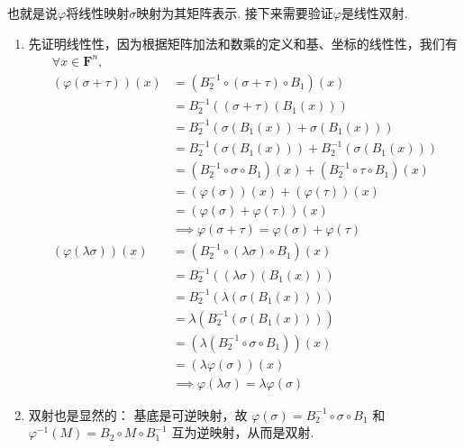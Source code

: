 也就是说$\varphi$将线性映射$\sigma$映射为其矩阵表示. 接下来需要验证$\varphi$是线性双射.
\begin{enumerate}
    \item 先证明线性性，因为根据矩阵加法和数乘的定义和基、坐标的线性性，我们有
          \begin{align*}
            \forall x\in\mathbf{F}^n, \\
            (\varphi(\sigma + \tau))(x)
            &= (B_2^{-1} \circ (\sigma + \tau) \circ B_1) (x) \\
            &= B_2^{-1} ((\sigma + \tau) (B_1 (x))) \\
            &= B_2^{-1} (\sigma (B_1 (x)) + \sigma (B_1 (x))) \\
            &= B_2^{-1} (\sigma (B_1 (x))) + B_2^{-1} (\sigma (B_1 (x))) \\
            &= (B_2^{-1} \circ \sigma \circ B_1) (x) + (B_2^{-1} \circ \tau \circ B_1) (x) \\
            &= (\varphi(\sigma))(x) + (\varphi(\tau))(x) \\
            &= (\varphi(\sigma) + \varphi(\tau))(x)\\
            &\implies \varphi(\sigma + \tau) = \varphi(\sigma) + \varphi(\tau)\\
            (\varphi(\lambda\sigma))(x)
            &= (B_2^{-1} \circ (\lambda\sigma) \circ B_1)(x)\\
            &= B_2^{-1} ((\lambda\sigma)(B_1(x)))\\
            &= B_2^{-1} (\lambda (\sigma(B_1(x))))\\
            &= \lambda (B_2^{-1} (\sigma (B_1(x))))\\
            &= (\lambda (B_2^{-1}\circ\sigma\circ B_1))(x)\\
            &= (\lambda \varphi(\sigma))(x)\\
            &\implies \varphi(\lambda\sigma) = \lambda \varphi(\sigma)
          \end{align*}

    \item 双射也是显然的：
          基底是可逆映射，故 $\varphi(\sigma) = B_2^{-1} \circ \sigma \circ B_1$ 和 $\varphi^{-1}(M) =  B_2 \circ M \circ B_1^{-1}$ 互为逆映射，从而是双射.


\end{enumerate}

